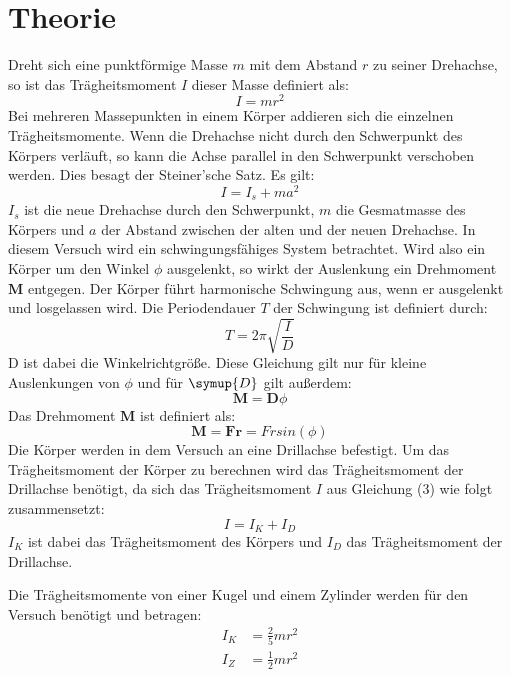 \section{Theorie}
\label{sec:Theorie}

\cite{sample}
Dreht sich eine punktförmige Masse $m$ mit dem Abstand $r$ zu seiner Drehachse, so
ist das Trägheitsmoment $I$ dieser Masse definiert als:
\begin{equation}
  I = m r^2
\end{equation}
Bei mehreren Massepunkten in einem Körper addieren sich die einzelnen
Trägheitsmomente.
Wenn die Drehachse nicht durch den Schwerpunkt des Körpers verläuft, so kann
die Achse parallel in den Schwerpunkt verschoben werden. Dies besagt der Steiner'sche
Satz. Es gilt:
\begin{equation}
  I = I_s + m a^2
\end{equation}
$I_s$ ist die neue Drehachse durch den Schwerpunkt, $m$ die Gesmatmasse
des Körpers und $a$ der Abstand zwischen der alten und der neuen Drehachse.
In diesem Versuch wird ein schwingungsfähiges System betrachtet. Wird also ein Körper
um den Winkel $\phi$ ausgelenkt, so wirkt der Auslenkung ein Drehmoment $\symbf{M}$ entgegen.
Der Körper führt harmonische Schwingung aus, wenn er ausgelenkt und
losgelassen wird. Die Periodendauer $T$ der Schwingung ist definiert durch:
\begin{equation}
  T = 2 \pi \sqrt{\frac{I}{D}}
\end{equation}
D ist dabei die Winkelrichtgröße. Diese Gleichung gilt nur für
kleine Auslenkungen von $\phi$ und für $\symup{D}$ gilt außerdem:
\begin{equation}
  \symbf{M} = \symbf{D} \phi
\end{equation}
Das Drehmoment $\symbf{M}$ ist definiert als:
\begin{equation}
  \symbf{M} = \symbf{F}{\symbf{r}} = F r sin(\phi)
\end{equation}
Die Körper werden in dem Versuch an eine Drillachse befestigt. Um das Trägheitsmoment
der Körper zu berechnen wird das Trägheitsmoment der Drillachse benötigt, da sich
das Trägheitsmoment $I$ aus Gleichung (3) wie folgt zusammensetzt:
\begin{equation}
  I = I_K + I_D
\end{equation}
$I_K$ ist dabei das Trägheitsmoment des Körpers und $I_D$ das
Trägheitsmoment der Drill\-achse.

Die Trägheitsmomente von einer Kugel und einem Zylinder werden für den Versuch benötigt
und betragen:
\begin{align}
  I_K &= \frac{2}{5}mr^2 \\
  I_Z &= \frac{1}{2}mr^2
\end{align}

